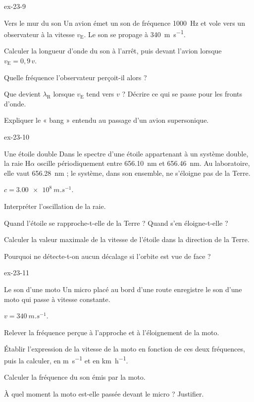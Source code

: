 \begin{blocLivre}{ex-23-9}
\begin{exercice}[2]{Vers le mur du son}
Un avion émet un son de fréquence \qty{1000}{Hz} et vole vers un observateur à la vitesse $v_\mathrm{E}$. Le son se propage à
\qty{340}{m.s^{-1}}.
\begin{questions}
\item Calculer la longueur d'onde du son à l'arrêt, puis devant l'avion lorsque $v_\mathrm{E}=0{,}9\,v$.
\item Quelle fréquence l'observateur perçoit-il alors ?
\item Que devient $\lambda_\mathrm{R}$ lorsque $v_\mathrm{E}$ tend vers $v$ ? Décrire ce qui se passe pour les fronts d'onde.
\item Expliquer le « bang » entendu au passage d'un avion supersonique.
\end{questions}
\end{exercice}
\end{blocLivre}
\begin{blocLivre}{ex-23-10}
\begin{exercice}[2]{Une étoile double}
Dans le spectre d'une étoile appartenant à un système double, la raie H$\alpha$ oscille périodiquement entre \qty{656,10}{nm} et
\qty{656,46}{nm}. Au laboratoire, elle vaut \qty{656,28}{nm} ; le système, dans son ensemble, ne s'éloigne pas de la Terre.
\begin{donnees}
$c=\qty{3,00e8}{m.s^{-1}}$.
\end{donnees}
\begin{questions}
\item Interpréter l'oscillation de la raie.
\item Quand l'étoile se rapproche-t-elle de la Terre ? Quand s'en éloigne-t-elle ?
\item Calculer la valeur maximale de la vitesse de l'étoile dans la direction de la Terre.
\item Pourquoi ne détecte-t-on aucun décalage si l'orbite est vue de face ?
\end{questions}
\end{exercice}
\end{blocLivre}
\begin{blocLivre}{ex-23-11}
\begin{exercice}[2]{Le son d'une moto}
Un micro placé au bord d'une route enregistre le son d'une moto qui passe à vitesse constante.
\begin{donnees}
$v=\qty{340}{m.s^{-1}}$.
\end{donnees}
\begin{questions}
\item Relever la fréquence perçue à l'approche et à l'éloignement de la moto.
\item Établir l'expression de la vitesse de la moto en fonction de ces deux fréquences, puis la calculer, en
\unit{m.s^{-1}} et en \unit{km.h^{-1}}.
\item Calculer la fréquence du son émis par la moto.
\item À quel moment la moto est-elle passée devant le micro ? Justifier.
\end{questions}
\end{exercice}
\end{blocLivre}

